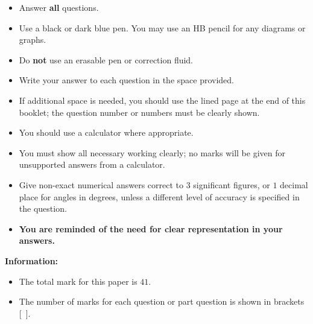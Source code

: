 \documentclass[11pt]{article}
\begin{document}
{\large
	
	\begin{itemize}
		
		\item Answer {\bf all} questions.
		
		\item Use a black or dark blue pen. You may use an HB pencil for
		any diagrams or graphs.
		
		\item Do {\bf not} use an erasable pen or correction fluid.
		
		\item Write your answer to each question in the space provided.
		
		\item If additional space is needed, you should use the lined page
		at the end of this booklet; the question number or numbers must be
		clearly shown.
		
		\item You should use a calculator where appropriate.
		
		\item You must show all necessary working clearly; no marks will
		be given for unsupported answers from a calculator.
		
		\item Give non-exact numerical answers correct to $3$ significant
		figures, or $1$ decimal place for angles in degrees, unless a
		different level of accuracy is specified in the question.
		
		\item {\bf You are reminded of the need for clear representation
			in your answers.}
	\end{itemize}
	
} 
\vfill 
\medskip
{\LARGE\bf Information:} 

\begin{itemize}
	
	\item The total mark for this paper is $41$. 
	
	\item The number of marks for each question or part question is
	shown in brackets [\ ].
	
\end{itemize}




 
\end{document}
